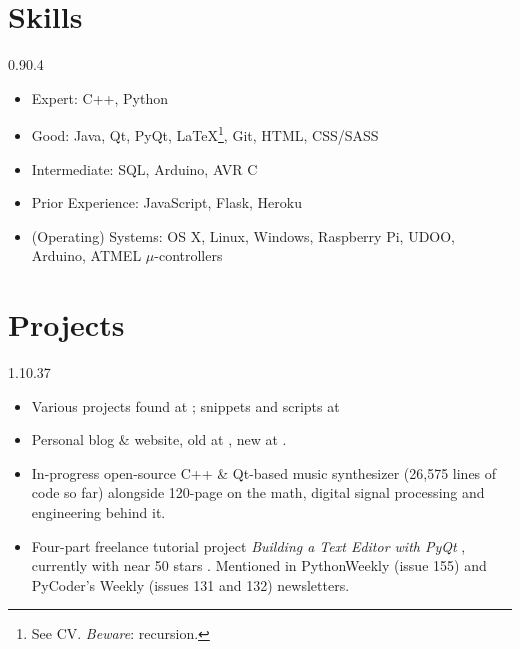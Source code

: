 \section{Skills}{0.9}{0.4}
\vspace{-2mm}
\begin{multicols}{2}
	\begin{itemize}
		\item Expert: C++, Python
		\item Good: Java, Qt, PyQt, \LaTeX\footnote{See CV. \emph{Beware}: recursion.}, Git, HTML, CSS/SASS
		\item Intermediate: SQL, Arduino, AVR C
		\item Prior Experience: JavaScript, Flask, Heroku
		\item (Operating) Systems: OS X, Linux, Windows, Raspberry Pi, UDOO, Arduino, ATMEL $\mu$-controllers
	\end{itemize}
\end{multicols}

\section{Projects}{1.1}{0.37}
\vspace{-6mm}
\begin{itemize}
	\item Various projects found at
	; snippets and scripts at 
	\item Personal blog \& website, old at , new at .
	\item In-progress open-source C++ \& Qt-based music synthesizer  (26,575 lines of code so far) alongside 120-page  on the math, digital signal processing and engineering behind it.
	\item Four-part freelance tutorial project \emph{Building a Text Editor with PyQt} , currently with near 50 stars . Mentioned in PythonWeekly (issue 155) and PyCoder's Weekly (issues 131 and 132) newsletters.
\end{itemize}

